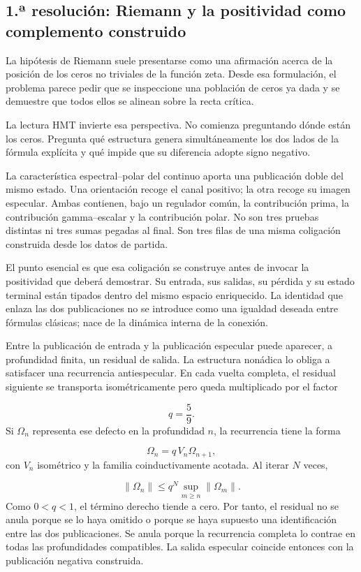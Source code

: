 \subsection{1.ª resolución: Riemann y la positividad como complemento construido}
La hipótesis de Riemann suele presentarse como una afirmación acerca de la posición de los ceros no triviales de la función zeta. Desde esa formulación, el problema parece pedir que se inspeccione una población de ceros ya dada y se demuestre que todos ellos se alinean sobre la recta crítica.\par
La lectura HMT invierte esa perspectiva. No comienza preguntando dónde están los ceros. Pregunta qué estructura genera simultáneamente los dos lados de la fórmula explícita y qué impide que su diferencia adopte signo negativo.\par
La característica espectral–polar del continuo aporta una publicación doble del mismo estado. Una orientación recoge el canal positivo; la otra recoge su imagen especular. Ambas contienen, bajo un regulador común, la contribución prima, la contribución gamma–escalar y la contribución polar. No son tres pruebas distintas ni tres sumas pegadas al final. Son tres filas de una misma coligación construida desde los datos de partida.\par
El punto esencial es que esa coligación se construye antes de invocar la positividad que deberá demostrar. Su entrada, sus salidas, su pérdida y su estado terminal están tipados dentro del mismo espacio enriquecido. La identidad que enlaza las dos publicaciones no se introduce como una igualdad deseada entre fórmulas clásicas; nace de la dinámica interna de la conexión.\par
Entre la publicación de entrada y la publicación especular puede aparecer, a profundidad finita, un residual de salida. La estructura nonádica lo obliga a satisfacer una recurrencia antiespecular. En cada vuelta completa, el residual siguiente se transporta isométricamente pero queda multiplicado por el factor\par
\[
q=\frac{5}{9}.
\]
Si \(\Omega_n\) representa ese defecto en la profundidad \(n\), la recurrencia tiene la forma\par
\[
\Omega_n=q\,V_n\Omega_{n+1},
\]
con \(V_n\) isométrico y la familia coinductivamente acotada. Al iterar \(N\) veces,\par
\[
\|\Omega_n\|
\le q^N\sup_{m\ge n}\|\Omega_m\|.
\]
Como \(0<q<1\), el término derecho tiende a cero. Por tanto, el residual no se anula porque se lo haya omitido o porque se haya supuesto una identificación entre las dos publicaciones. Se anula porque la recurrencia completa lo contrae en todas las profundidades compatibles. La salida especular coincide entonces con la publicación negativa construida.\par
